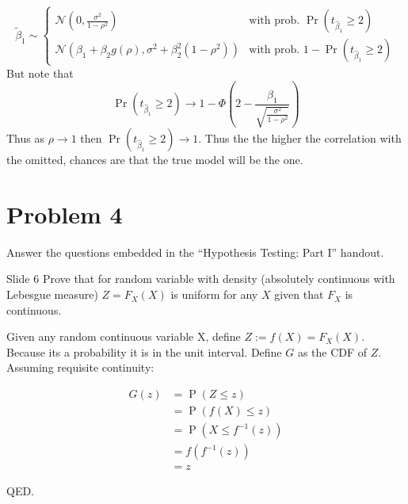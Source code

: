 \documentclass{article}
\begin{document}
\begin{solution}
\begin{enumerate}[label=(\alph*)]
\begin{equation*}
        \tilde{\beta}_1\sim\begin{cases}
        \mathcal{N}\left(0,\frac{\sigma^2}{1-\rho^2}\right) &\mbox{with prob. } \Pr(t_{\hat{\beta}_1}\geq 2) \\ 
        \mathcal{N}\left(\beta_1+\beta_2g(\rho),\sigma^2+\beta_2^2(1-\rho^2)\right) &\mbox{with prob. } 1-\Pr(t_{\hat{\beta}_1}\geq 2)
        \end{cases}
    \end{equation*}
    But note that 
    \begin{equation*}
        \Pr(t_{\hat{\beta}_1}\geq 2) \longrightarrow 1-\Phi\left(2-\frac{\beta_1}{\sqrt{\frac{\sigma^2}{1-\rho^2}}} \right) 
    \end{equation*}
    Thus as $\rho\to 1$ then $\Pr(t_{\hat{\beta}_1}\geq 2)\to 1$. Thus the the higher the correlation with the omitted, chances are that the true model will be the one. 
\end{enumerate}

\end{solution}

\newpage

\section*{Problem 4}
Answer the questions embedded in the ``Hypothesis Testing: Part I'' handout.

\begin{problem}{Slide 6}
Prove that for random variable with density (absolutely continuous with
Lebesgue measure) $Z = F_X (X )$ is uniform for any $X$ given
that $F_X$ is continuous.
\end{problem}

\begin{solution}
Given any random continuous variable X, define $Z := f(X) = F_X(X)$. Because its a probability it is in the unit interval. Define $G$ as the CDF of $Z$. Assuming requisite continuity:

\begin{align*}
G(z) &= \operatorname{P}(Z\leq z) \\
        &= \operatorname{P}(f(X)\leq z) \\
        &= \operatorname{P}(X\leq f^{-1}(z)) \\
        &= f (f^{-1}(z)) \\
        &= z
\end{align*}

QED.

\end{solution}
\end{document}
